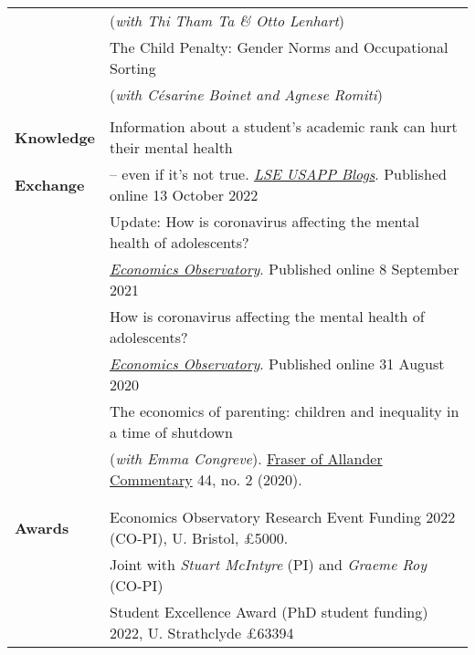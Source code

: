 \documentclass[11pt,a4paper]{article}
\begin{document}
\begin{longtable}{l l}
																							& (\textit{with Thi Tham Ta \& Otto Lenhart})  \\
\addlinespace
																							& The Child Penalty: Gender Norms and Occupational Sorting \\
																							& (\textit{with C\'esarine Boinet and Agnese Romiti})  \\
																							&      \\
\textbf{Knowledge}                      &  Information about a student’s academic rank can hurt their mental health  \\ 
\textbf{Exchange} 									       &  – even if it’s not true. \href{https://bit.ly/3CVAiGP}{\textit{LSE USAPP Blogs}}. Published online 13 October 2022    \\
\addlinespace
																												 &  Update: How is coronavirus affecting the mental health of adolescents?    \\
 										 																		 &  \href{https://www.economicsobservatory.com/update-how-is-coronavirus-affecting-the-mental-health-of-adolescents}{\textit{Economics Observatory}}. Published online 8 September 2021    \\
\addlinespace
																												&  How is coronavirus affecting the mental health of adolescents?   \\
																												&  \href{https://www.economicsobservatory.com/how-coronavirus-affecting-mental-health-adolescents}{\textit{Economics Observatory}}. Published online 31 August 2020  \\		
\addlinespace
																												&  The economics of parenting: children and inequality in a time of shutdown  \\ 
																												& (\textit{with Emma Congreve}). \href{https://strathprints.strath.ac.uk/74641/}{Fraser of Allander Commentary} 44, no. 2 (2020).  \\
																												&   \\	
																												&  \\   %
\textbf{Awards}                            &  Economics Observatory Research Event Funding 2022 (CO-PI), U. Bristol, \pounds5000.   \\
																												&  Joint with \textit{Stuart McIntyre} (PI) and \textit{Graeme Roy} (CO-PI)   \\
\addlinespace
																												&  Student Excellence Award (PhD student funding) 2022, U. Strathclyde \pounds63394   \\

\end{longtable}
\end{document}
